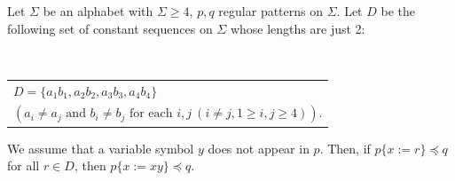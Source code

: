 \begin{lem}\label{補題14}
Let $\Sigma$ be an alphabet with $\Sigma \ge 4$, $p,q$ regular patterns on $\Sigma$.
Let $D$ be the following set of constant sequences on $\Sigma$ whose lengths are just 2:

\medskip
\noindent
~~\begin{tabular}{l}
  $D = \{ a_{1}b_{1}, a_{2}b_{2}, a_{3}b_{3}, a_{4}b_{4} \}$\\
  $(a_{i} \ne a_{j} \mbox{ and } b_{i} \ne b_{j} \mbox{ for each } i,j~(i\ne j, 1\ge i,j\ge 4))$.
\end{tabular}
\medskip

\noindent
We assume that a variable symbol $y$ does not appear in $p$.
Then, if $p \{ x := r \} \preceq q$ for all $r \in D$, then $p \{ x := xy \} \preceq q$.  
\end{lem}
